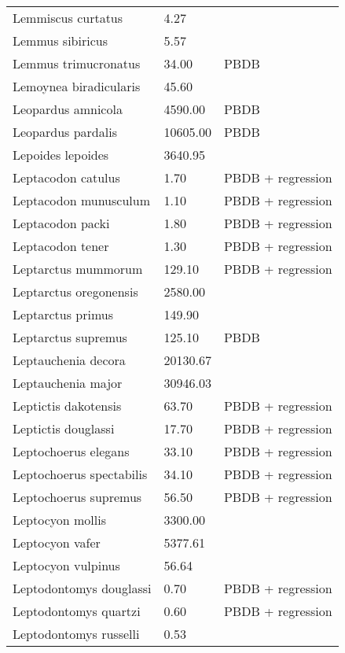 \begin{longtable}{p{} p{} p{}}
    Lemmiscus curtatus & 4.27 & \cite{Smith2004} \\ 
    Lemmus sibiricus & 5.57 & \cite{Smith2004} \\ 
    Lemmus trimucronatus & 34.00 & PBDB \\ 
    Lemoynea biradicularis & 45.60 & \cite{Tomiya2013} \\ 
    Leopardus amnicola & 4590.00 & PBDB \\ 
    Leopardus pardalis & 10605.00 & PBDB \\ 
    Lepoides lepoides & 3640.95 & \cite{Tomiya2013} \\ 
    Leptacodon catulus & 1.70 & PBDB + regression \\ 
    Leptacodon munusculum & 1.10 & PBDB + regression \\ 
    Leptacodon packi & 1.80 & PBDB + regression \\ 
    Leptacodon tener & 1.30 & PBDB + regression \\ 
    Leptarctus mummorum & 129.10 & PBDB + regression \\ 
    Leptarctus oregonensis & 2580.00 & \cite{McKenna2011} \\ 
    Leptarctus primus & 149.90 & \cite{Tomiya2013} \\ 
    Leptarctus supremus & 125.10 & PBDB \\ 
    Leptauchenia decora & 20130.67 & \cite{Tomiya2013} \\ 
    Leptauchenia major & 30946.03 & \cite{Tomiya2013} \\ 
    Leptictis dakotensis & 63.70 & PBDB + regression \\ 
    Leptictis douglassi & 17.70 & PBDB + regression \\ 
    Leptochoerus elegans & 33.10 & PBDB + regression \\ 
    Leptochoerus spectabilis & 34.10 & PBDB + regression \\ 
    Leptochoerus supremus & 56.50 & PBDB + regression \\ 
    Leptocyon mollis & 3300.00 & \cite{McKenna2011} \\ 
    Leptocyon vafer & 5377.61 & \cite{Tomiya2013} \\ 
    Leptocyon vulpinus & 56.64 & \cite{Carranza-Castaneda1992} \\ 
    Leptodontomys douglassi & 0.70 & PBDB + regression \\ 
    Leptodontomys quartzi & 0.60 & PBDB + regression \\ 
    Leptodontomys russelli & 0.53 & \cite{Mihlbacher2010} \\ 

\end{longtable}
